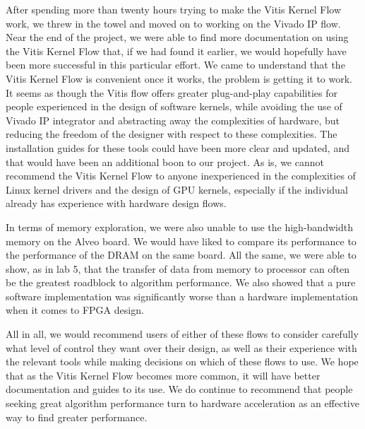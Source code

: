 \documentclass[11pt, final, conference, letterpaper, twocolumn]{IEEEtran}[2015/08/26]
\begin{document}
After spending more than twenty hours trying to make the Vitis Kernel Flow work, we threw in the towel and moved on to working on the Vivado IP flow. Near the end of the project, we were able to find more documentation on using the Vitis Kernel Flow that, if we had found it earlier, we would hopefully have been more successful in this particular effort.
We came to understand that the Vitis Kernel Flow is convenient once it works, the problem is getting it to work. It seems as though the Vitis flow offers greater plug-and-play capabilities for people experienced in the design of software kernels, while avoiding the use of Vivado IP integrator and abstracting away the complexities of hardware, but reducing the freedom of the designer with respect to these complexities.
The installation guides for these tools could have been more clear and updated, and that would have been an additional boon to our project. As is, we cannot recommend the Vitis Kernel Flow to anyone inexperienced in the complexities of Linux kernel drivers and the design of GPU kernels, especially if the individual already has experience with hardware design flows.

In terms of memory exploration, we were also unable to use the high-bandwidth memory on the Alveo board. We would have liked to compare its performance to the performance of the DRAM on the same board. All the same, we were able to show, as in lab 5, that the transfer of data from memory to processor can often be the greatest roadblock to algorithm performance. We also showed that a pure software implementation was significantly worse than a hardware implementation when it comes to FPGA design.

All in all, we would recommend users of either of these flows to consider carefully what level of control they want over their design, as well as their experience with the relevant tools while making decisions on which of these flows to use. We hope that as the Vitis Kernel Flow becomes more common, it will have better documentation and guides to its use. We do continue to recommend that people seeking great algorithm performance turn to hardware acceleration as an effective way to find greater performance.

\end{document}
